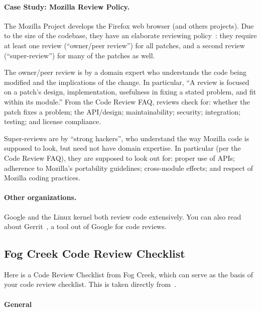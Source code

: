 \paragraph{Case Study: Mozilla Review Policy.}
The Mozilla Project develops the Firefox web browser (and others
projects). Due to the size of the codebase, they have an elaborate
reviewing
policy~\cite{moz:sr, moz:cr}:
they require at least one review (``owner/peer review'') for all
patches, and a second review (``super-review'') for many of the
patches as well.

The owner/peer review is by a domain expert who understands the code
being modified and the implications of the change.  In particular, ``A
review is focused on a patch's design, implementation, usefulness in
fixing a stated problem, and fit within its module.''  From the Code
Review FAQ, reviews check for: whether the patch fixes a problem; the
API/design; maintainability; security; integration; testing; and
license compliance.

Super-reviews are by ``strong hackers'', who understand the way
Mozilla code is supposed to look, but need not have domain expertise.
In particular (per the Code Review FAQ), they are supposed to look out
for: proper use of APIs; adherence to Mozilla's portability
guidelines; cross-module effects; and respect of Mozilla coding
practices.

\paragraph{Other organizations.} Google and the Linux kernel both
review code extensively. You can also read about
Gerrit~\cite{gerrit}, a tool out of
Google for code reviews.

\subsection*{Fog Creek Code Review Checklist}

Here is a Code Review Checklist from Fog Creek, which can serve as the basis of your code review checklist. This is taken directly from~\cite{reviewcl}.

\paragraph{General}

